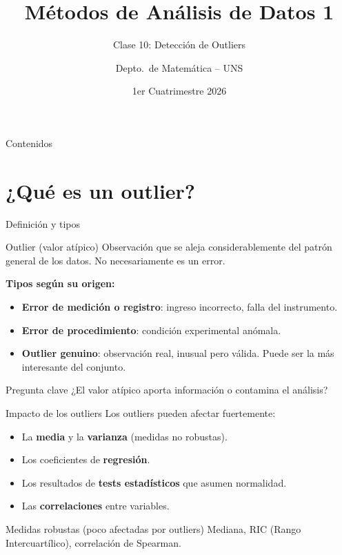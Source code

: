 \documentclass[aspectratio=169]{beamer}
\title{Métodos de Análisis de Datos 1}
\subtitle{Clase 10: Detección de Outliers}
\author{Depto.\ de Matemática -- UNS}
\institute{Universidad Nacional del Sur}
\date{1er Cuatrimestre 2026}
\begin{document}
\begin{frame}
  \titlepage
\end{frame}

\begin{frame}{Contenidos}
  \tableofcontents
\end{frame}

\section{¿Qué es un outlier?}

\begin{frame}{Definición y tipos}
  \begin{block}{Outlier (valor atípico)}
    Observación que se aleja considerablemente del patrón general de los datos. No necesariamente es un error.
  \end{block}
  \bigskip
  \textbf{Tipos según su origen:}
  \begin{itemize}
    \item \textbf{Error de medición o registro}: ingreso incorrecto, falla del instrumento.
    \item \textbf{Error de procedimiento}: condición experimental anómala.
    \item \textbf{Outlier genuino}: observación real, inusual pero válida. Puede ser la más interesante del conjunto.
  \end{itemize}
  \bigskip
  \begin{alertblock}{Pregunta clave}
    ¿El valor atípico aporta información o contamina el análisis?
  \end{alertblock}
\end{frame}

\begin{frame}{Impacto de los outliers}
  Los outliers pueden afectar fuertemente:
  \begin{itemize}
    \item La \textbf{media} y la \textbf{varianza} (medidas no robustas).
    \item Los coeficientes de \textbf{regresión}.
    \item Los resultados de \textbf{tests estadísticos} que asumen normalidad.
    \item Las \textbf{correlaciones} entre variables.
  \end{itemize}
  \bigskip
  \begin{block}{Medidas robustas (poco afectadas por outliers)}
    Mediana, RIC (Rango Intercuartílico), correlación de Spearman.
  \end{block}
\end{frame}
\end{document}

